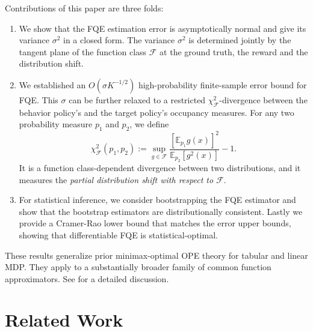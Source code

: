 \documentclass{article}
\numberwithin{equation}{section}
\newcommand{\pref}[1]{\prettyref{#1}}
\theoremstyle{plain}
\theoremstyle{definition}
\theoremstyle{remark}
\begin{document}
 Contributions of this paper are three folds:
\vspace{-5pt}
\begin{enumerate}[leftmargin=*,itemsep=0pt]
    \item We show that the FQE estimation error is asymptotically normal and give its variance $\sigma^2$ in a closed form. The variance $\sigma^2$ is determined jointly by the tangent plane of the function class $\mathcal{F}$ at the ground truth, the reward and the distribution shift.
    \item We established an $O(\sigma K^{-1/2})$ high-probability finite-sample error bound for FQE. This $\sigma$ can be further relaxed to a restricted $\chi^2_{\mathcal{F}}$-divergence between the behavior policy's and the target policy's occupancy measures. For any two probability measure $p_1$ and $p_2$, we define 
    \begin{equation}\label{definition_chi_square}
        \chi^2_{\mathcal{F}} (p_1,p_2) := \sup_{g \in \mathcal{F}} \frac{\left[\mathbb{E}_{p_1} g(x)\right]^2}{\mathbb{E}_{p_2}\left[g^2(x)\right]} - 1.
    \end{equation}
    It is a function class-dependent divergence between two distributions, and it measures the {\it partial distribution shift with respect to $\mathcal{F}$}.
    \item For statistical inference, we consider bootstrapping the FQE estimator and show that the bootstrap estimators are distributionally consistent. Lastly we provide a Cramer-Rao lower bound that matches the error upper bounds, showing that differentiable FQE is statistical-optimal. 
\end{enumerate}
These results generalize prior minimax-optimal OPE theory for tabular and linear MDP. They apply to a substantially broader family of common function approximators. See \pref{sec:special_cases} for a detailed discussion.

\section{Related Work}\label{sec:related_work}
\end{document}
